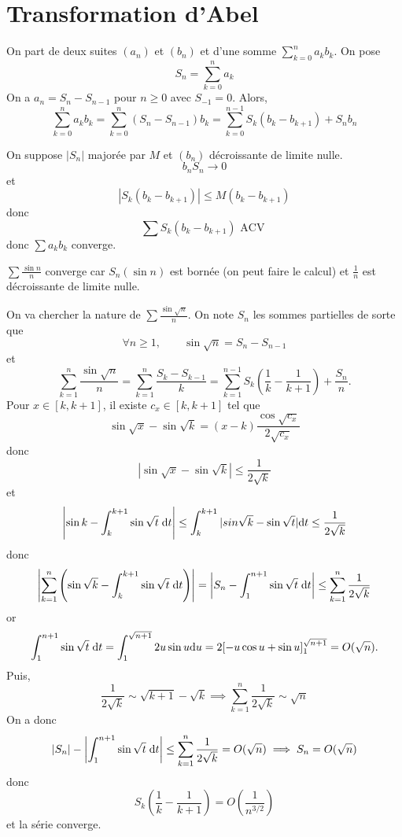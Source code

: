 \section{Transformation d'Abel}

On part de deux suites $(a_n)$ et $(b_n)$ et d'une somme $\displaystyle\sum_{k=0}^na_kb_k$. On pose \[
    S_n=\sum_{k=0}^na_k
\]
On a $a_n=S_n-S_{n-1}$ pour $n\geq 0$ avec $S_{-1}=0$. Alors, \[
    \sum_{k=0}^na_kb_k=\sum_{k=0}^n(S_n-S_{n-1})b_k=\sum_{k=0}^{n-1}S_k(b_k-b_{k+1})+S_n b_n
\]

\begin{ex}
    On suppose $|S_n|$ majorée par $M$ et $(b_n)$ décroissante de limite nulle. \[
        b_nS_n\longrightarrow0
    \]
    et \[
        |S_k(b_k-b_{k+1})|\leq M(b_k-b_{k+1})
    \]
    donc \[
        \sum S_k(b_k-b_{k+1})\text{ ACV }
    \]
    donc $\sum a_kb_k$ converge.
\end{ex}

\begin{ex}
    $\sum\frac{\sin n}n$ converge car $S_n(\sin n)$ est bornée (on peut faire le calcul) et $\frac1n$ est décroissante de limite nulle.
\end{ex}

\begin{ex}
    On va chercher la nature de $\sum \frac{\sin \sqrt n}n$. On note $S_n$ les sommes partielles de sorte que \[
        \forall n\geq 1, \qquad \sin \sqrt n=S_{n}-S_{n-1}
    \]
    et \[
        \sum_{k=1}^n\frac{\sin \sqrt n}{n}=\sum_{k=1}^n\frac{S_k-S_{k-1}}k=\sum_{k=1}^{n-1}S_k \left( \frac1k-\frac1{k+1} \right)+\frac{S_n}n.
    \]
    Pour $x\in [k, k+1]$, il existe $c_x\in[k, k+1]$ tel que \[
        \sin\sqrt x-\sin \sqrt k=(x-k)\frac{\cos \sqrt {c_x}}{2\sqrt {c_x}}
    \]
    donc \[
        |\sin \sqrt x-\sin \sqrt k|\leq \frac1{2\sqrt k}
    \]
    et \[
        \left| \sin k-\int_k^{k+1}\sin\sqrt t\;\mathrm{d} t \right|\leq \int_k^{k+1}|sin\sqrt k-\sin \sqrt t|\mathrm{d} t\leq \frac1{2\sqrt k}
    \]
    donc \[
        \left| \sum_{k=1}^n\left(\sin \sqrt k-\int_k^{k+1}\sin\sqrt t\;\mathrm{d} t\right) \right|= \left| S_n-\int_1^{n+1}\sin\sqrt t\;\mathrm{d} t \right| \leq \sum_{k=1}^n\frac1{2\sqrt k}
    \]
    or \[
        \int_1^{n+1}\sin\sqrt t\;\mathrm{d} t=\int_1^{\sqrt{n+1}}2u\sin u\mathrm{d} u=2[-u\cos u+\sin u]_1^{\sqrt{n+1}}=O(\sqrt n).
    \]
    Puis, \[
        \frac1{2\sqrt k}\sim\sqrt {k+1}-\sqrt k \implies \sum_{k=1}^n\frac1{2\sqrt k}\sim \sqrt n
    \]
    On a donc \[
        |S_n|- \left| \int_1^{n+1}\sin\sqrt t\;\mathrm{d} t \right|\leq \sum_{k=1}^n\frac1{2\sqrt k}=O(\sqrt n)\implies S_n=O(\sqrt n)
    \]
    donc \[
        S_k \left( \frac1k-\frac1{k+1} \right)=O\left(\frac1{n^{3/2}}\right)
    \]
    et la série converge.
\end{ex}

